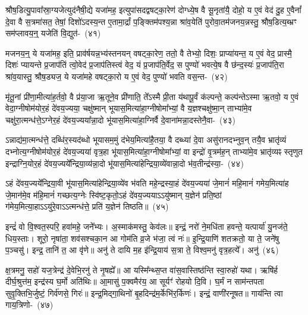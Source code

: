 श्रौष॒डित्यु॒पावा᳚स्रा॒ग्यजेत्युद॑नैषी॒द्ये यजा॑मह॒ इत्युपा॑स\-दद्वषट्का॒रेण॑ दोग्ध्ये॒ष वै सू॒नृता॑यै॒ दोहो॒ य ए॒वं वेद॑ दु॒ह ए॒वैनां᳚ दे॒वा वै स॒त्रमा॑सत॒ तेषां॒ दिशो॑\-ऽदस्य॒न्त ए॒तामा॒र्द्रां प॒ङ्क्तिम॑पश्य॒न्ना श्रा॑व॒येति॑ पुरोवा॒तम॑जनय॒न्नस्तु॒ श्रौष॒डित्य॒ब्भ्रꣳ सम॑प्लावय॒न्॒ यजेति॑ वि॒द्युत॑-~(४१)\ip

मजनय॒न्॒ ये यजा॑मह॒ इति॒ प्राव॑र्\mbox{}षयन्न॒भ्य॑स्तनयन् वषट्का॒रेण॒ ततो॒ वै तेभ्यो॒ दिशः॒ प्राप्या॑यन्त॒ य ए॒वं वेद॒ प्रास्मै॒ दिशः॑ प्यायन्ते प्र॒जा\-प॑तिं त्वो॒वेद॑ प्र॒जा\-प॑तिस्त्वं वेद॒ यं प्र॒जा\-प॑ति॒र्वेद॒ स पुण्यो॑ भवत्ये॒ष वै छ॑न्द॒स्यः॑ प्र॒जा\-प॑ति॒रा श्रा॑व॒यास्तु॒ श्रौष॒ड्यज॒ ये यजा॑महे वषट्का॒रो य ए॒वं वेद॒ पुण्यो॑ भवति वस॒न्त-~(४२)\ip

मृ॑तू॒नां प्री॑णा॒मीत्या॑ह॒र्तवो॒ वै प्र॑या॒जा ऋ॒तूने॒व प्री॑णाति॒ ते᳚\-ऽस्मै प्री॒ता य॑थापू॒र्वं क॑ल्पन्ते॒ कल्प॑न्ते\-ऽस्मा ऋ॒तवो॒ य ए॒वं वेदा॒ग्नी\-षोम॑योर॒हं दे॑वय॒ज्यया॒ चक्षु॑ष्मान् भूयास॒मित्या॑हा॒ग्नी\-षोमा᳚भ्यां॒ वै य॒ज्ञश्चक्षु॑ष्मा॒न् ताभ्या॑मे॒व चक्षु॑रा॒त्मन्ध॑त्ते॒\-ऽग्नेर॒हं दे॑वय॒ज्यया᳚न्ना॒दो भू॑यास॒मित्या॑हा॒ग्निर्वै दे॒वाना॑मन्ना॒दस्तेनै॒वा-~(४३)\ip

ऽन्नाद्य॑मा॒त्मन्ध॑त्ते॒ दब्धि॑र॒स्यद॑ब्धो भूयासम॒मुं द॑भेय॒मित्या॑\-है॒तया॒ वै दब्ध्या॑ दे॒वा असु॑रानदभ्नुव॒न् तयै॒व भ्रातृ॑व्यं दभ्नोत्य॒ग्नी\-षोम॑यो\-र॒हं दे॑वय॒ज्यया॑ वृत्र॒हा भू॑यास॒मित्या॑हा॒ग्नी\-षोमा᳚भ्यां॒ वा इन्द्रो॑ वृ॒त्रम॑ह॒न् ताभ्या॑मे॒व भ्रातृ॑व्यꣴ स्तृणुत इन्द्राग्नि॒योर॒हं दे॑व\-य॒ज्यये᳚\-न्द्रिया॒व्य॑न्ना॒दो भू॑यास॒मित्या॑हेन्द्रिया॒व्ये॑वान्ना॒दो भ॑व॒तीन्द्र॑स्या॒-~(४४)\ip

ऽहं दे॑वय॒ज्यये᳚न्द्रिया॒वी भू॑यास॒मित्या॑हेन्द्रिया॒व्ये॑व भ॑वति महे॒न्द्रस्या॒हं दे॑वय॒ज्यया॑ जे॒मानं॑ महि॒मानं॑ गमेय॒मित्या॑ह जे॒मान॑मे॒व म॑हि॒मानं॑ गच्छत्य॒ग्नेः स्वि॑ष्ट॒कृतो॒\-ऽहं दे॑वय॒ज्यया\-ऽऽ\-यु॑ष्मान् य॒ज्ञेन॑ प्रति॒ष्ठां ग॑मेय॒मित्या॒हा\-ऽऽ\-यु॑रे॒वा\-ऽऽ\-त्मन्ध॑त्ते॒ प्रति॑ य॒ज्ञेन॑ तिष्ठति॥~(४५)\ip

{\anuvakamend[{प्र॒ति॒ष्ठाम॑ह्व॒दस्तु॑ वि॒द्युतं॑ वस॒न्तमे॒वेन्द्र॑स्या॒\-ऽष्टात्रिꣳ॑शच्च}]}%

इन्द्रं॑ वो वि॒श्वत॒स्परि॒ हवा॑महे॒ जने᳚भ्यः। अ॒स्माक॑मस्तु॒ केव॑लः॥ इन्द्रं॒ नरो॑ ने॒मधि॑ता हवन्ते॒ यत्पार्या॑ यु॒नज॑ते॒ धिय॒स्ताः। शूरो॒ नृषा॑ता॒ शव॑सश्चका॒न आ गोम॑ति व्र॒जे भ॑जा॒ त्वं नः॑॥ इ॒न्द्रि॒याणि॑ शतक्रतो॒ या ते॒ जने॑षु प॒ञ्चसु॑। इन्द्र॒ तानि॑ त॒ आ वृ॑णे॥ अनु॑ ते दायि म॒ह इ॑न्द्रि॒याय॑ स॒त्रा ते॒ विश्व॒मनु॑ वृत्र॒हत्ये᳚। अनु॑~(४६)\ip

क्ष॒त्रमनु॒ सहो॑ यज॒त्रेन्द्र॑ दे॒वेभि॒रनु॑ ते नृ॒षह्ये᳚॥ आ यस्मि᳚न्थ्स॒प्त वा॑स॒वास्तिष्ठ॑न्ति स्वा॒रुहो॑ यथा। ऋषि॑र्\mbox{}ह दीर्घ॒श्रुत्त॑म॒ इन्द्र॑स्य घ॒र्मो अति॑थिः॥ आ॒मासु॑ प॒क्वमैर॑य॒ आ सूर्यꣳ॑ रोहयो दि॒वि। घ॒र्मं न साम॑न्तपता सुवृ॒क्तिभि॒र्जुष्टं॒ गिर्व॑णसे॒ गिरः॑॥ इन्द्र॒मिद्गा॒थिनो॑ बृ॒हदिन्द्र॑म॒र्केभि॑र॒र्किणः॑। इन्द्रं॒ वाणी॑रनूषत॥ गाय॑न्ति त्वा \mbox{गाय॒त्रिणो-~(४७)\ip}

